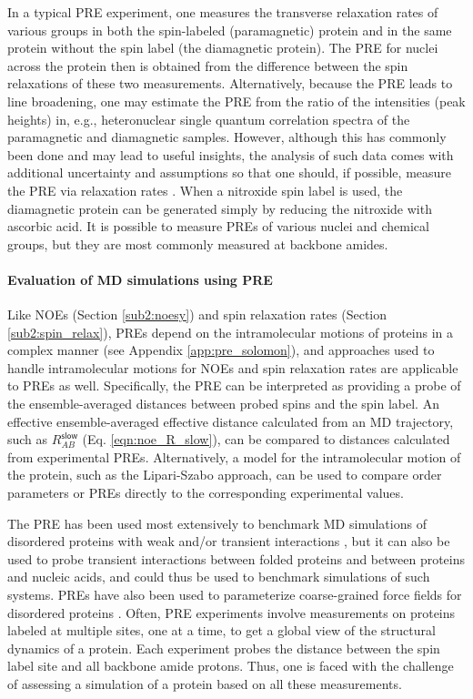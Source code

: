 \documentclass[9pt,review,pubversion]{livecoms}
\begin{document}
In a typical PRE experiment, one measures the transverse relaxation rates of various groups in both the spin-labeled (paramagnetic) protein and in the same protein without the spin label (the diamagnetic protein).
The PRE for nuclei across the protein then is obtained from the difference between the spin relaxations of these two measurements.
Alternatively, because the PRE leads to line broadening, one may estimate the PRE from the ratio of the intensities (peak heights) in, e.g., heteronuclear single quantum correlation spectra of the paramagnetic and diamagnetic samples.
However, although this has commonly been done and may lead to useful insights, the analysis of such data comes with additional uncertainty and assumptions so that one should, if possible, measure the PRE via relaxation rates \cite{clore2009theory}.
When a nitroxide spin label is used, the diamagnetic protein can be generated simply by reducing the nitroxide with ascorbic acid.
It is possible to measure PREs of various nuclei and chemical groups, but they are most commonly measured at backbone amides.

\paragraph{Evaluation of MD simulations using PRE}

Like NOEs (Section \ref{sub2:noesy}) and spin relaxation rates (Section \ref{sub2:spin_relax}), PREs depend on the intramolecular motions of proteins in a complex manner (see Appendix \ref{app:pre_solomon}), and approaches used to handle intramolecular motions for NOEs and spin relaxation rates are applicable to PREs as well.
Specifically, the PRE can be interpreted as providing a probe of the ensemble-averaged distances between probed spins and the spin label.
An effective ensemble-averaged effective distance calculated from an MD trajectory, such as $R_{AB}^{\mathsf{slow}}$ (Eq. \ref{eqn:noe_R_slow}), can be compared to distances calculated from experimental PREs.
Alternatively, a model for the intramolecular motion of the protein, such as the Lipari-Szabo approach, can be used to compare order parameters or PREs directly to the corresponding experimental values.

The PRE has been used most extensively to benchmark MD simulations of disordered proteins with weak and/or transient interactions \cite{piana_water_2015,robustelli_developing_2018}, but it can also be used to probe transient interactions between folded proteins and between proteins and nucleic acids, and could thus be used to benchmark simulations of such systems.
PREs have also been used to parameterize coarse-grained force fields for disordered proteins \cite{norgaard2008experimental,tesei2021accurate}.
Often, PRE experiments involve measurements on proteins labeled at multiple sites, one at a time, to get a global view of the structural dynamics of a protein.
Each experiment probes the distance between the spin label site and all backbone amide protons.
Thus, one is faced with the challenge of assessing a simulation of a protein based on all these measurements.
\end{document}
